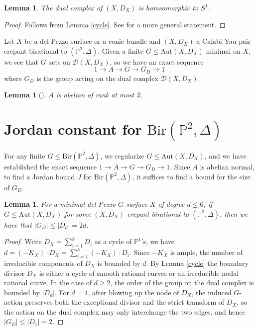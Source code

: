 \documentclass[a4paper,12pt,oneside]{amsart}
\numberwithin{equation}{section}
\newtheorem{lemma}[theorem]{Lemma}
\theoremstyle{definition}
\theoremstyle{remark}
\newcommand{\PP}{\mathbb{P}}
\newcommand{\Ptwo}{\mathbb{P}^2}
\newcommand{\Bir}{\mathrm{Bir}}
\newcommand{\Aut}{\mathrm{Aut}}
\begin{document}
\begin{lemma}
The dual complex of $(X, D_X)$ is homeomorphic to $S^1$.
\end{lemma}
\begin{proof}
Follows from Lemma \ref{cycle}. See \cite[Lemma 1.6.3]{przy} for a more general statement.
\end{proof}

Let $X$ be a del Pezzo surface or a conic bundle and $(X,D_X)$ a Calabi-Yau pair crepant birational to $(\Ptwo, \Delta)$. Given a finite $G \leqslant \mathrm{Aut}(X, D_X)$ minimal on $X$, we see that $G$ acts on $\mathcal D(X,D_X)$, so we have an exact sequence
\[
1 \to A \to G \to G_D \to 1
\]
where $G_D$ is the group acting on the dual complex $\mathcal D(X,D_X)$.

\begin{lemma}[{\cite[Proposition 2.5.2]{przy}}]\label{abelian}
$A$ is abelian of rank at most 2.
\end{lemma}



\section{Jordan constant for $\mathrm{Bir}(\PP^2, \Delta)$}
For any finite $G\leqslant \Bir(\Ptwo,\Delta)$, we regularize $G\leqslant \Aut(X,D_X)$, and we have established the exact sequence $1 \to A \to G \to G_D \to 1$.
Since $A$ is abelian normal, to find a Jordan bound $J$ for $\mathrm{Bir}(\mathbb{P}^2, \Delta)$, it suffices to find a bound for the size of $G_D$.

\begin{lemma}
For a minimal del Pezzo $G$-surface $X$ of degree $d\leq 6$, if $G\leqslant \Aut(X,D_X)$ for some $(X,D_X)$ crepant birational to $(\Ptwo, \Delta)$, then we have that $|G_D| \leq |D_d|= 2d$.\\
\end{lemma}
\begin{proof}
Write
\(
D_X=\sum_{i=1}^k D_i
\)
as a cycle of $\mathbb P^1$'s, we have
\(
d = (-K_X)\cdot D_X = \sum_{i=1}^k (-K_X)\cdot D_i.
\)
Since $-K_X$ is ample, the number of irreducible components of $D_X$ is bounded by $d$. By Lemma \ref{cycle} the boundary divisor $D_X$ is either a cycle of smooth rational curves or an irreducible nodal rational curve. In the case of $ d\geq 2$, the order of the group on the dual complex is bounded by $|D_d|$. For \(d=1\), after blowing up the node of \(D_X\), the induced \(G\)-action preserves both the exceptional divisor and the strict transform of \(D_X\), so the action on the dual complex may only interchange the two edges, and hence \(|G_D| \le |D_1| = 2\).
\end{proof}
\end{document}
